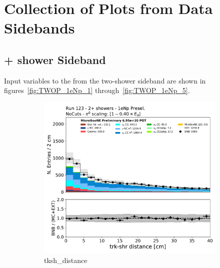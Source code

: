 \section{Collection of Plots from Data Sidebands}
\label{app:datasidebandplotdump}

\subsection{+ shower Sideband}
\label{app:sideband:1eNptwoplusshower}
Input variables to the \npsel from the two-shower sideband are shown in figures~\ref{fig:TWOP_1eNp_1} through~\ref{fig:TWOP_1eNp_5}.

\begin{figure}[H]
    \centering
    \begin{subfigure}{0.3\textwidth}
    \includegraphics[width=1.0\textwidth]{Sidebands/Figures/1eNp/TwoShower/TwoPShr_NP_None_pi0e040/tksh_distance.pdf}
    \caption{tksh\_distance}
    \end{subfigure}
    \begin{subfigure}{0.3\textwidth}

\end{subfigure}
\end{figure}
